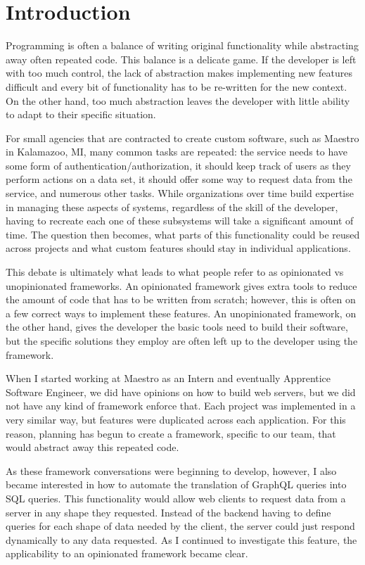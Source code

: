 \section{Introduction}

Programming is often a balance of writing original functionality while abstracting away often repeated code.  This balance is a delicate game.  If the developer is left with too much control, the lack of abstraction makes implementing new features difficult and every bit of functionality has to be re-written for the new context.  On the other hand, too much abstraction leaves the developer with little ability to adapt to their specific situation.

For small agencies that are contracted to create custom software, such as Maestro in Kalamazoo, MI, many common tasks are repeated:  the service needs to have some form of authentication/authorization, it should keep track of users as they perform actions on a data set, it should offer some way to request data from the service, and numerous other tasks.  While organizations over time build expertise in managing these aspects of systems, regardless of the skill of the developer, having to recreate each one of these subsystems will take a significant amount of time.  The question then becomes, what parts of this functionality could be reused across projects and what custom features should stay in individual applications.

This debate is ultimately what leads to what people refer to as opinionated vs unopinionated frameworks.  An opinionated framework gives extra tools to reduce the amount of code that has to be written from scratch; however, this is often on a few correct ways to implement these features.  An unopinionated framework, on the other hand, gives the developer the basic tools need to build their software, but the specific solutions they employ are often left up to the developer using the framework.

When I started working at Maestro as an Intern and eventually Apprentice Software Engineer, we did have opinions on how to build web servers, but we did not have any kind of framework enforce that.  Each project was implemented in a very similar way, but features were duplicated across each application.  For this reason, planning has begun to create a framework, specific to our team, that would abstract away this repeated code.

As these framework conversations were beginning to develop, however, I also became interested in how to automate the translation of GraphQL queries into SQL queries.  This functionality would allow web clients to request data from a server in any shape they requested.  Instead of the backend having to define queries for each shape of data needed by the client, the server could just respond dynamically to any data requested.  As I continued to investigate this feature, the applicability to an opinionated framework became clear.

